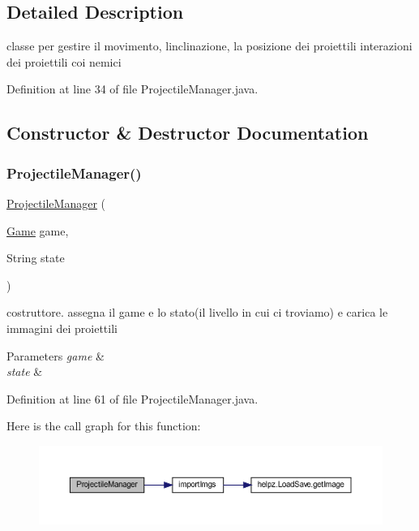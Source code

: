 \subsection{Detailed Description}
classe per gestire il movimento, l\textquotesingle{}inclinazione, la posizione dei proiettili interazioni dei proiettili coi nemici 

Definition at line 34 of file Projectile\+Manager.\+java.



\subsection{Constructor \& Destructor Documentation}
\mbox{\label{classmanagers_1_1_projectile_manager_a8959cc2d690b9ea6bf95b0b029352d50}} 
\subsubsection{\texorpdfstring{Projectile\+Manager()}{ProjectileManager()}}
{\footnotesize\ttfamily \hyperlink{classmanagers_1_1_projectile_manager}{Projectile\+Manager} (\begin{DoxyParamCaption}\item[{\hyperlink{classprogetto_1_1_game}{Game}}]{game,  }\item[{String}]{state }\end{DoxyParamCaption})}



costruttore. assegna il game e lo stato(il livello in cui ci troviamo) e carica le immagini dei proiettili 


\begin{DoxyParams}{Parameters}
{\em game} & \\
\hline
{\em state} & \\
\hline
\end{DoxyParams}


Definition at line 61 of file Projectile\+Manager.\+java.

Here is the call graph for this function\+:
\nopagebreak
\begin{figure}[H]
\begin{center}
\leavevmode
\includegraphics[width=350pt]{classmanagers_1_1_projectile_manager_a8959cc2d690b9ea6bf95b0b029352d50_cgraph}
\end{center}
\end{figure}


